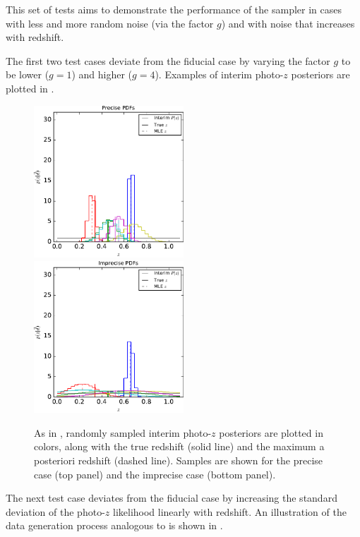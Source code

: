 This set of tests aims to demonstrate the performance of the sampler in cases with less and more random noise (via the factor $g$) and with noise that increases with redshift.

The first two test cases deviate from the fiducial case by varying the factor $g$ to be lower ($g=1$) and higher ($g=4$).  
Examples of interim photo-$z$ posteriors are plotted in .

\begin{figure}
	\includegraphics[width=0.5\textwidth]{figures/chippr/sig1_samplepzs.pdf}\\
	\includegraphics[width=0.5\textwidth]{figures/chippr/sig4_samplepzs.pdf}
	\caption{As in , randomly sampled interim photo-$z$ posteriors are plotted in colors, along with the true redshift (solid line) and the maximum a posteriori redshift (dashed line).  
		Samples are shown for the precise case (top panel) and the imprecise case (bottom panel).}
\end{figure}

The next test case deviates from the fiducial case by increasing the standard deviation of the photo-$z$ likelihood linearly with redshift. 
An illustration of the data generation process analogous to  is shown in .

